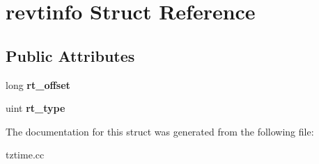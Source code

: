\hypertarget{structrevtinfo}{}\section{revtinfo Struct Reference}
\label{structrevtinfo}
\subsection*{Public Attributes}
\begin{DoxyCompactItemize}
\item 
\mbox{\label{structrevtinfo_a177c2126bd7339a18cf64ae6472b58bd}} 
long {\bfseries rt\+\_\+offset}
\item 
\mbox{\label{structrevtinfo_ac350864418bf365630f8955b26f9d565}} 
uint {\bfseries rt\+\_\+type}
\end{DoxyCompactItemize}


The documentation for this struct was generated from the following file\+:\begin{DoxyCompactItemize}
\item 
tztime.\+cc\end{DoxyCompactItemize}
